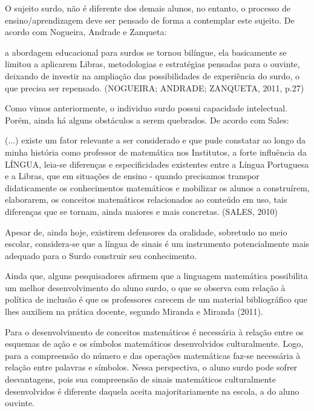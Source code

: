 \documentclass[brasil]{abnt}
\begin{document}
	O sujeito surdo, não é diferente dos demais alunos, no entanto, o processo de ensino/aprendizagem deve ser pensado de forma a contemplar este sujeito. De acordo com Nogueira, Andrade e Zanqueta:

		\begin{citacao}[...] a abordagem educacional para surdos se tornou bilíngue, ela basicamente se limitou a aplicarem Libras, metodologias e estratégias pensadas para o ouvinte, deixando de investir 
						na ampliação das possibilidades de experiência do surdo, o que precisa ser repensado. (NOGUEIRA; ANDRADE; ZANQUETA, 2011, p.27)
		\end{citacao}
	
	Como vimos anteriormente, o individuo surdo possui capacidade intelectual. Porém, ainda há alguns obstáculos a serem quebrados. De acordo com Sales:
			
			\begin{citacao} (...) existe um fator relevante a ser considerado e que pude constatar ao longo da minha história como professor de matemática nos Institutos, a forte influência da LÍNGUA, 
							leia-se diferenças e especificidades existentes entre a Língua Portuguesa e a Libras, que em situações de ensino - quando precisamos transpor didaticamente os conhecimentos 
							matemáticos e mobilizar os alunos a construírem, elaborarem, os conceitos matemáticos relacionados ao conteúdo em uso, tais diferenças que se tornam, ainda maiores e mais 
							concretas. (SALES, 2010) 
			\end{citacao}
	
	Apesar de, ainda hoje, existirem defensores da oralidade, sobretudo no meio escolar, considera-se que a língua de sinais é um instrumento potencialmente mais adequado para o Surdo construir seu 
	conhecimento. 	 
	
	Ainda que, alguns pesquisadores afirmem que a linguagem matemática possibilita um melhor desenvolvimento do aluno surdo, o que se observa com relação à política de inclusão é que os professores carecem 
	de um material bibliográfico que lhes auxiliem na prática docente, segundo Miranda e Miranda (2011).
	
	Para o desenvolvimento de conceitos matemáticos é necessária à relação entre os esquemas de ação e os símbolos matemáticos desenvolvidos culturalmente. Logo, para a compreensão do número e das operações 
	matemáticas faz-se necessária à relação entre palavras e símbolos. Nessa perspectiva, o aluno surdo pode sofrer desvantagens, pois sua compreensão de sinais matemáticos culturalmente desenvolvidos é 
	diferente daquela aceita majoritariamente na escola, a do aluno ouvinte.
\end{document}
